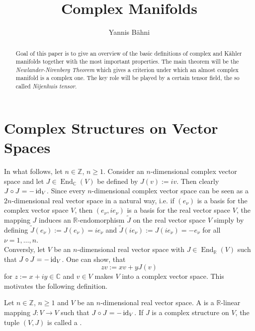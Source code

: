 
\newcommand{\Cscr}{\mathscr{C}}
\newcommand{\op}{\mathrm{op}}
\DeclareMathOperator\End{End}
\DeclareMathOperator\Hom{Hom}
\DeclareMathOperator\Mat{Mat}
\DeclareMathOperator\GL{GL}
\DeclareMathOperator\supp{supp}
\newcommand{\Xfrak}{\mathfrak{X}}
\newcommand{\Ascr}{\mathscr{A}}
\newcommand{\Lup}{\mathrm{L}}

\title{Complex Manifolds}
\author{Yannis B\"ahni}
\address[Yannis B\"ahni]{University of Zurich, R\"amistrasse 71, 8006 Zurich}


\maketitle
\begin{abstract}
Goal of this paper is to give an overview of the basic definitions of complex and K\"ahler manifolds together with the most important properties. The main theorem will be the \emph{Newlander-Nirenberg Theorem} which gives a criterion under which an almost complex manifold is a complex one. The key role will be played by a certain tensor field, the so called \emph{Nijenhuis tensor}.
\end{abstract}

\tableofcontents

\section{Complex Structures on Vector Spaces}
In what follows, let $n \in \mathbb{Z}$, $n \geq 1$. Consider an $n$-dimensional complex vector space and let $J \in \End_\mathbb{C}(V)$ be defined by $J(v) := iv$. Then clearly $J \circ J = -\operatorname{id}_V$. Since every $n$-dimensional complex vector space can be seen as a $2n$-dimensional real vector space in a natural way, i.e. if $(e_\nu)$ is a basis for the complex vector space $V$, then $(e_\nu,ie_\nu)$ is a basis for the real vector space $V$, the mapping $J$ induces an $\mathbb{R}$-endomorphism $\widetilde{J}$ on the real vector space $V$ simply by defining $\widetilde{J}(e_\nu) := J(e_\nu) = ie_\nu$ and $\widetilde{J}(ie_\nu) := J(ie_\nu) = -e_\nu$ for all $\nu = 1,\dots,n$.\\
Conversly, let $V$ be an $n$-dimensional real vector space with $J \in \End_\mathbb{R}(V)$ such that $J \circ J = -\operatorname{id}_V$. One can show, that 
\begin{equation}
zv := xv + yJ(v)
\label{eq:complex}
\end{equation}
\noindent for $z := x + iy \in \mathbb{C}$ and $v \in V$ makes $V$ into a complex vector space. This motivates the following definition.
\begin{definition}
Let $n \in \mathbb{Z}$, $n \geq 1$ and $V$ be an $n$-dimensional real vector space. A  is a $\mathbb{R}$-linear mapping $J: V \to V$ such that $J \circ J = -\operatorname{id}_V$. If $J$ is a complex structure on $V$, the tuple $(V,J)$ is called a .
\end{definition}

